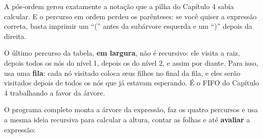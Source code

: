 A pós-ordem gerou exatamente a notação que a pilha do Capítulo 4 sabia calcular. E o percurso em ordem perdeu os parênteses: se você quiser a expressão correta, basta imprimir um ``('' antes da subárvore esquerda e um ``)'' depois da direita.

O último percurso da tabela, \textbf{em largura}, não é recursivo: ele visita a raiz, depois todos os nós do nível 1, depois os do nível 2, e assim por diante. Para isso, usa uma \textbf{fila}: cada nó visitado coloca seus filhos no final da fila, e eles serão visitados depois de todos os nós que já estavam esperando. É o FIFO do Capítulo 4 trabalhando a favor da árvore.

O programa completo monta a árvore da expressão, faz os quatro percursos e usa a mesma ideia recursiva para calcular a altura, contar as folhas e até \textbf{avaliar} a expressão:

